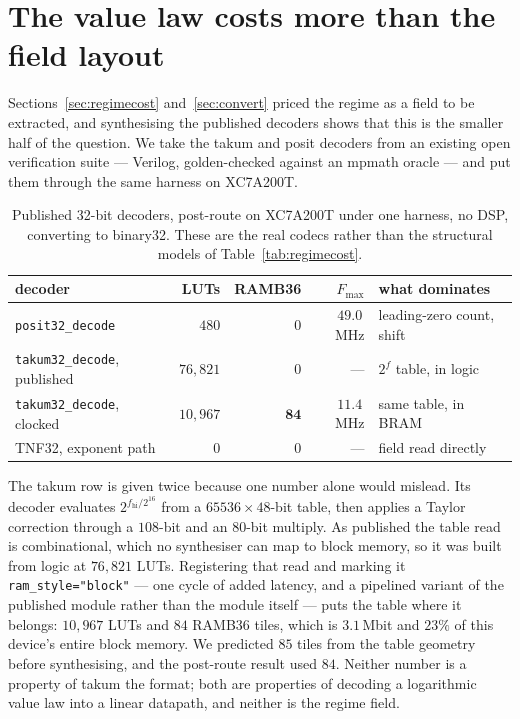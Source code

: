 \section{The value law costs more than the field layout}
\label{sec:valuelaw}



Sections~\ref{sec:regimecost} and~\ref{sec:convert} priced the regime as a field
to be extracted, and synthesising the published decoders shows that this is the
smaller half of the question. We take the takum and posit decoders from an
existing open verification suite --- Verilog, golden-checked against an mpmath
oracle --- and put them through the same harness on XC7A200T.

\begin{table}[t]\centering
\caption{Published 32-bit decoders, post-route on XC7A200T under one harness, no
DSP, converting to binary32. These are the real codecs rather than the structural
models of Table~\ref{tab:regimecost}.}
\label{tab:realcodecs}
\begin{tabular}{lrrrl}
\toprule
decoder & LUTs & RAMB36 & $F_{\max}$ & what dominates \\
\midrule
\texttt{posit32\_decode} & $480$ & $0$ & $49.0$\,MHz & leading-zero count, shift \\
\texttt{takum32\_decode}, published & $76{,}821$ & $0$ & --- & $2^{f}$ table, in logic \\
\texttt{takum32\_decode}, clocked & $10{,}967$ & $\mathbf{84}$ & $11.4$\,MHz & same table, in BRAM \\
TNF32, exponent path & $0$ & $0$ & --- & field read directly \\
\bottomrule
\end{tabular}
\end{table}

The takum row is given twice because one number alone would mislead. Its decoder
evaluates $2^{f_{\mathrm{hi}}/2^{16}}$ from a $65536 \times 48$-bit table, then
applies a Taylor correction through a $108$-bit and an $80$-bit multiply. As
published the table read is combinational, which no synthesiser can map to block
memory, so it was built from logic at $76{,}821$ LUTs. Registering that read and
marking it \texttt{ram\_style="block"} --- one cycle of added latency, and a
pipelined variant of the published module rather than the module itself --- puts
the table where it belongs: $10{,}967$ LUTs and $84$ RAMB36 tiles, which is
$3.1$\,Mbit and $23\%$ of this device's entire block memory. We predicted $85$
tiles from the table geometry before synthesising, and the post-route result used $84$. Neither
number is a property of takum the format; both are properties of decoding a
logarithmic value law into a linear datapath, and neither is the regime field.

